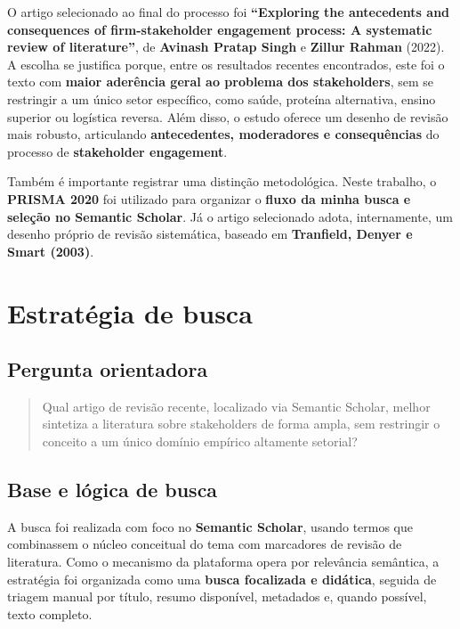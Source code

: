\documentclass[12pt]{article}
\begin{document}
O artigo selecionado ao final do processo foi \textbf{“Exploring the antecedents and consequences of firm-stakeholder engagement process: A systematic review of literature”}, de \textbf{Avinash Pratap Singh} e \textbf{Zillur Rahman} (2022). A escolha se justifica porque, entre os resultados recentes encontrados, este foi o texto com \textbf{maior aderência geral ao problema dos stakeholders}, sem se restringir a um único setor específico, como saúde, proteína alternativa, ensino superior ou logística reversa. Além disso, o estudo oferece um desenho de revisão mais robusto, articulando \textbf{antecedentes, moderadores e consequências} do processo de \textbf{stakeholder engagement}.

Também é importante registrar uma distinção metodológica. Neste trabalho, o \textbf{PRISMA 2020} foi utilizado para organizar o \textbf{fluxo da minha busca e seleção no Semantic Scholar}. Já o artigo selecionado adota, internamente, um desenho próprio de revisão sistemática, baseado em \textbf{Tranfield, Denyer e Smart (2003)}.

\section{Estratégia de busca}
\label{sec:org466a398}

\subsection{Pergunta orientadora}
\label{sec:orga9df4ea}

\begin{quote}
Qual artigo de revisão recente, localizado via Semantic Scholar, melhor sintetiza a literatura sobre stakeholders de forma ampla, sem restringir o conceito a um único domínio empírico altamente setorial?
\end{quote}

\subsection{Base e lógica de busca}
\label{sec:orgc330d1d}

A busca foi realizada com foco no \textbf{Semantic Scholar}, usando termos que combinassem o núcleo conceitual do tema com marcadores de revisão de literatura. Como o mecanismo da plataforma opera por relevância semântica, a estratégia foi organizada como uma \textbf{busca focalizada e didática}, seguida de triagem manual por título, resumo disponível, metadados e, quando possível, texto completo.
\end{document}
